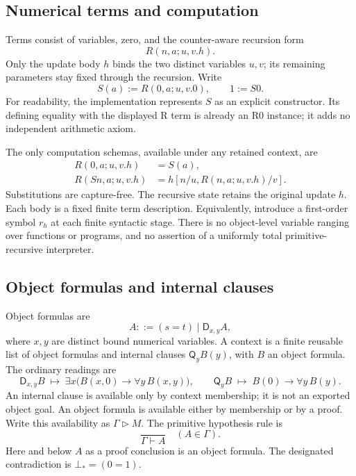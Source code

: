 \documentclass[11pt,letterpaper]{article}
\theoremstyle{definition}\newtheorem{definition}[theorem]{Definition}
\theoremstyle{remark}\newtheorem{remark}[theorem]{Remark}
\newcommand{\D}{\ensuremath{\mathsf D}}
\newcommand{\Q}{\ensuremath{\mathsf Q}}
\newcommand{\av}{\mathrel{\triangleright}}
\begin{document}
\subsection{Numerical terms and computation}

Terms consist of variables, zero, and the counter-aware recursion form
\[
                       R(n,a;u,v.h).
\]
Only the update body $h$ binds the two distinct variables $u,v$; its
remaining parameters stay fixed through the recursion. Write
\[
 S(a):=R(0,a;u,v.0),\qquad 1:=S0.
\]
For readability, the implementation represents $S$ as an explicit
constructor. Its defining equality with the displayed R term is already
an R0 instance; it adds no independent arithmetic axiom.

The only computation schemas, available under any retained context, are
\begin{align}
 R(0,a;u,v.h)&=S(a),\tag{R0}\label{eq:R0}\\
 R(Sn,a;u,v.h)&=h[n/u,R(n,a;u,v.h)/v].\tag{RS}\label{eq:RS}
\end{align}
Substitutions are capture-free. The recursive state retains the original
update $h$. Each body is a fixed finite term description. Equivalently,
introduce a first-order symbol $r_h$ at each finite syntactic stage.
There is no object-level variable ranging over functions or programs,
and no assertion of a uniformly total primitive-recursive interpreter.

\subsection{Object formulas and internal clauses}

Object formulas are
\[
                         A::=(s=t)\mid\D_{x,y}A,
\]
where $x,y$ are distinct bound numerical variables. A context is a finite
reusable list of object formulas and internal clauses $\Q_yB(y)$, with
$B$ an object formula. The ordinary readings are
\[
 \D_{x,y}B\;\mapsto\;
   \exists x\bigl(B(x,0)\to\forall y\,B(x,y)\bigr),
 \qquad
 \Q_yB\;\mapsto\;B(0)\to\forall y\,B(y).
\]
An internal clause is available only by context membership; it is not
an exported object goal. An object formula is available either by
membership or by a proof. Write this availability as $\Gamma\av M$.
The primitive hypothesis rule is
\[
                \frac{}{\Gamma\vdash A}\quad(A\in\Gamma).
                \tag{Hyp}
\]
Here and below $A$ as a proof conclusion is an object formula. The
designated contradiction is $\bot_*=(0=1)$.
\end{document}
